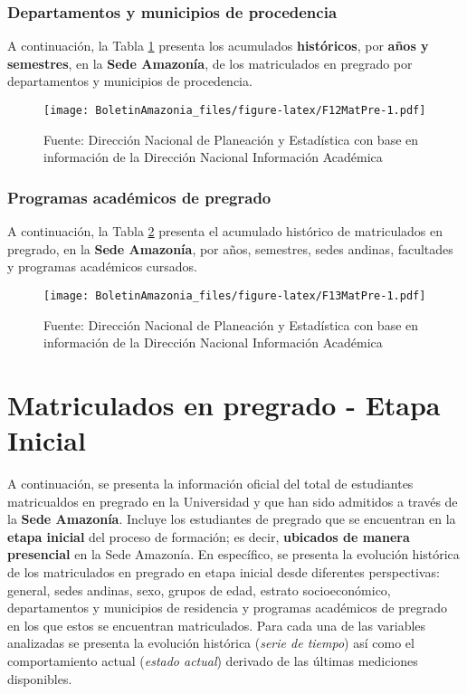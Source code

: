 \documentclass[
]{book}
\begin{document}
\hypertarget{departamentos-y-municipios-de-procedencia-2}{%
\subsubsection{Departamentos y municipios de procedencia}\label{departamentos-y-municipios-de-procedencia-2}}

A continuación, la Tabla \ref{fig:F12MatPre} presenta los acumulados \textbf{históricos}, por \textbf{años y semestres}, en la \textbf{Sede Amazonía}, de los matriculados en pregrado por departamentos y municipios de procedencia.

\begin{figure}
\centering
\texttt{[image: BoletinAmazonia\_files/figure-latex/F12MatPre-1.pdf]}
\caption{\label{fig:F12MatPre}Fuente: Dirección Nacional de Planeación y Estadística con base en información de la Dirección Nacional Información Académica}
\end{figure}

\hypertarget{programas-acaduxe9micos-de-pregrado-2}{%
\subsubsection{Programas académicos de pregrado}\label{programas-acaduxe9micos-de-pregrado-2}}

A continuación, la Tabla \ref{fig:F13MatPre} presenta el acumulado histórico de matriculados en pregrado, en la \textbf{Sede Amazonía}, por años, semestres, sedes andinas, facultades y programas académicos cursados.

\begin{figure}
\centering
\texttt{[image: BoletinAmazonia\_files/figure-latex/F13MatPre-1.pdf]}
\caption{\label{fig:F13MatPre}Fuente: Dirección Nacional de Planeación y Estadística con base en información de la Dirección Nacional Información Académica}
\end{figure}

\hypertarget{MatPreIni}{%
\section{Matriculados en pregrado - Etapa Inicial}\label{MatPreIni}}

A continuación, se presenta la información oficial del total de estudiantes matricualdos en pregrado en la Universidad y que han sido admitidos a través de la \textbf{Sede Amazonía}. Incluye los estudiantes de pregrado que se encuentran en la \textbf{etapa inicial} del proceso de formación; es decir, \textbf{ubicados de manera presencial} en la Sede Amazonía. En específico, se presenta la evolución histórica de los matriculados en pregrado en etapa inicial desde diferentes perspectivas: general, sedes andinas, sexo, grupos de edad, estrato socioeconómico, departamentos y municipios de residencia y programas académicos de pregrado en los que estos se encuentran matriculados. Para cada una de las variables analizadas se presenta la evolución histórica (\emph{serie de tiempo}) así como el comportamiento actual (\emph{estado actual}) derivado de las últimas mediciones disponibles.
\end{document}

